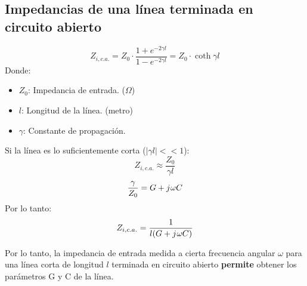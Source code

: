 \documentclass[
	12pt, %
	fleqn, %
	a4paper, %
	oneside, %
]{LegrandOrangeBook}
\begin{document}
\subsection{Impedancias de una línea terminada en circuito abierto}
\begin{definition}
\begin{equation}
Z_{i,c.a.}=Z_0\cdot\frac{1+e^{-2\gamma l}}{1-e^{-2\gamma l}}=Z_0\cdot\coth\gamma l
\end{equation}
Donde:
\begin{itemize}
\item $Z_0$: Impedancia de entrada. ($\Omega$)
\item $l$: Longitud de la línea. (metro)
\item $\gamma$: Constante de propagación.
\end{itemize}
Si la línea es lo suficientemente corta ($|\gamma l|<<1$):
\begin{equation*}
Z_{i,c.a.}\approx\frac{Z_0}{\gamma l}
\end{equation*}
\begin{equation}
\frac{\gamma}{Z_0}=G+{j\mkern1mu}\omega C
\label{eq:gamma/z0}
\end{equation}
Por lo tanto:
\begin{equation}
Z_{i,c.a.}=\frac{1}{l(G+{j\mkern1mu}\omega C)}
\end{equation}
\end{definition}
\begin{remark}
Por lo tanto, la impedancia de entrada medida a cierta frecuencia angular $\omega$ para una línea corta de longitud $l$ terminada en circuito abierto \textbf{permite} obtener los parámetros G y C de la línea.
\end{remark}
\end{document}
